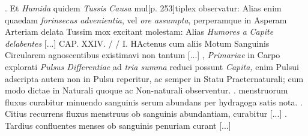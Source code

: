 \pend 
\newpage
{}. Et \textit{Humida} quidem \textit{Tussis Causa} mul[p. 253]tiplex
 observatur: Alias enim quaedam \textit{forinsecus advenientia}, vel \textit{ore assumpta}, perperamque in Asperam Arteriam delata Tussim mox excitant molestam: Alias \textit{Humores a} \textit{Capite delabentes} [...]
\pend%
\pstart%
[p. 267] CAP. XXIV. /  / I. HActenus cum aliis Motum Sanguinis Circularem agnoscentibus existimavi non tantum [...]
\pend%
, \textit{Primariae} in Carpo explorati \textit{Pulsus Differentiae} ad \textit{tria summa} reduci possunt \textit{Capita,}  enim Pulsui adscripta  autem non  in Pulsu reperitur, ac semper in Statu Praeternaturali; cum modo dictae in Naturali quoque ac Non-naturali observentur.
\pend%
.  menstruorum fluxus curabitur minuendo sanguinis serum abundans per hydragoga satis nota.
\pend%
. Citius recurrens fluxus menstruus ob sanguinis abundantiam, curabitur [...]
\pend%
. Tardius confluentes menses ob sanguinis penuriam curant [...]%
\pend%
\count{}
\count{}
\count{}
